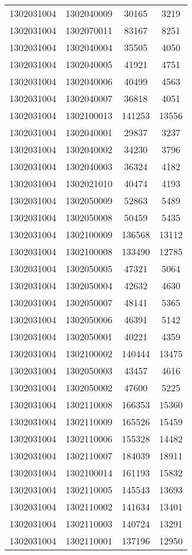 \begin{longtable}[h]{llcc}
		1302031004 & 1302040009 & 30165 & 3219\\
		1302031004 & 1302070011 & 83167 & 8251\\
		1302031004 & 1302040004 & 35505 & 4050\\
		1302031004 & 1302040005 & 41921 & 4751\\
		1302031004 & 1302040006 & 40499 & 4563\\
		1302031004 & 1302040007 & 36818 & 4051\\
		1302031004 & 1302100013 & 141253 & 13556\\
		1302031004 & 1302040001 & 29837 & 3237\\
		1302031004 & 1302040002 & 34230 & 3796\\
		1302031004 & 1302040003 & 36324 & 4182\\
		1302031004 & 1302021010 & 40474 & 4193\\
		1302031004 & 1302050009 & 52863 & 5489\\
		1302031004 & 1302050008 & 50459 & 5435\\
		1302031004 & 1302100009 & 136568 & 13112\\
		1302031004 & 1302100008 & 133490 & 12785\\
		1302031004 & 1302050005 & 47321 & 5064\\
		1302031004 & 1302050004 & 42632 & 4630\\
		1302031004 & 1302050007 & 48141 & 5365\\
		1302031004 & 1302050006 & 46391 & 5142\\
		1302031004 & 1302050001 & 40221 & 4359\\
		1302031004 & 1302100002 & 140444 & 13475\\
		1302031004 & 1302050003 & 43457 & 4616\\
		1302031004 & 1302050002 & 47600 & 5225\\
		1302031004 & 1302110008 & 166353 & 15360\\
		1302031004 & 1302110009 & 165526 & 15459\\
		1302031004 & 1302110006 & 155328 & 14482\\
		1302031004 & 1302110007 & 184039 & 18911\\
		1302031004 & 1302100014 & 161193 & 15832\\
		1302031004 & 1302110005 & 145543 & 13693\\
		1302031004 & 1302110002 & 141634 & 13401\\
		1302031004 & 1302110003 & 140724 & 13291\\
		1302031004 & 1302110001 & 137196 & 12950\\

\end{longtable}
